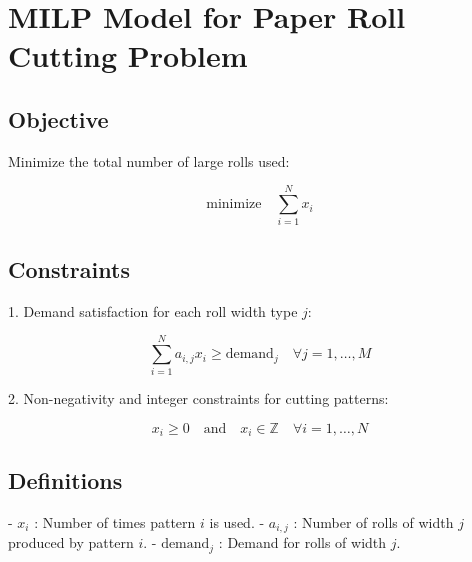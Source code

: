 \documentclass{article}
\begin{document}
\section*{MILP Model for Paper Roll Cutting Problem}

\subsection*{Objective}

Minimize the total number of large rolls used:

\[
\text{minimize} \quad \sum_{i=1}^{N} x_i
\]

\subsection*{Constraints}

1. Demand satisfaction for each roll width type \( j \):

\[
\sum_{i=1}^{N} a_{i,j} x_i \geq \text{demand}_j \quad \forall j = 1, \ldots, M
\]

2. Non-negativity and integer constraints for cutting patterns:

\[
x_i \geq 0 \quad \text{and} \quad x_i \in \mathbb{Z} \quad \forall i = 1, \ldots, N
\]

\subsection*{Definitions}

- \( x_i \) : Number of times pattern \( i \) is used.
- \( a_{i,j} \) : Number of rolls of width \( j \) produced by pattern \( i \).
- \( \text{demand}_j \) : Demand for rolls of width \( j \).
\end{document}
